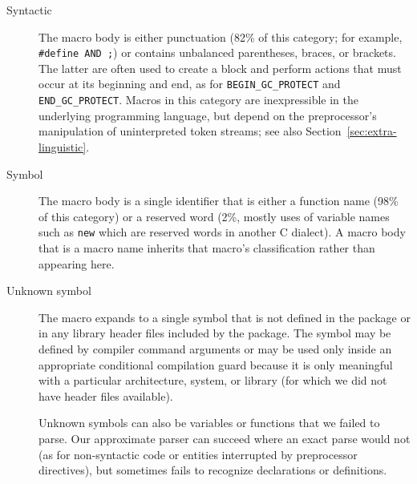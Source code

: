 \documentclass[10pt]{article}
\begin{document}
\begin{description}
\item[Syntactic]  The macro body is either punctuation (82\% of this
  category; for example, {\tt \#define AND ;}) or contains unbalanced
  parentheses, braces, or brackets.  The latter are often used to create a
  block and perform actions that must occur at its beginning and end, as
  for \verb|BEGIN_GC_PROTECT| and \verb|END_GC_PROTECT|.
  Macros in this category are inexpressible in the underlying programming
  language, but depend on the preprocessor's manipulation of uninterpreted
  token streams; see also Section~\ref{sec:extra-linguistic}.


\item[Symbol]
  The macro body is a single identifier that is either a function name
  (98\% of this category) or a reserved word (2\%, mostly uses of
  variable names such as {\tt new} which are reserved words in another
  C dialect).  A macro body that is a macro name inherits that macro's
  classification rather than appearing here.


\item[Unknown symbol]
  The macro expands to a single symbol that is not defined in the package
  or in any library header files included by the package.  The symbol may
  be defined by compiler command arguments or may be used only inside an
  appropriate conditional compilation guard because it is only meaningful
  with a particular architecture, system, or library (for which we did not
  have header files available).
  
  Unknown symbols can also be variables or functions that we failed to
  parse.  Our approximate parser can succeed where an exact parse would not
  (as for non-syntactic code or entities interrupted by preprocessor
  directives), but sometimes fails to recognize declarations or
  definitions.



\end{description}
\end{document}
